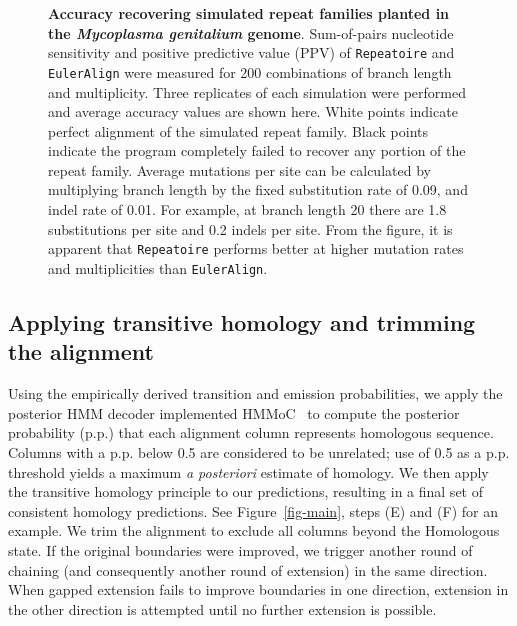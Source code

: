 \documentclass[12pt,journal,draftcls,letterpaper,onecolumn]{IEEEtran}
\begin{document}
\begin{figure*}[t!]
\centering {}
\caption[Accuracy recovering simulated repeat families planted in the
\textit{Mycoplasma genitalium} genome]%
{\textbf{Accuracy recovering simulated repeat families planted in the
\textit{Mycoplasma genitalium} genome}.  Sum-of-pairs nucleotide
sensitivity and positive predictive value (PPV) of \texttt{Repeatoire}
and \texttt{EulerAlign} were measured for 200
combinations of branch length and multiplicity.  Three replicates of
each simulation were performed and average accuracy values are shown
here.  White points indicate perfect alignment of the simulated repeat
family.  Black points indicate the program completely failed to
recover any portion of the repeat family.  Average mutations per site can be
calculated by multiplying branch length by the fixed substitution rate
of 0.09, and indel rate of 0.01.  For example, at branch length 20
there are 1.8 substitutions per site and 0.2 indels per site.  From
the figure, it is apparent that \texttt{Repeatoire} performs better
at higher mutation rates and multiplicities than \texttt{EulerAlign}.}
\label{fig-results}
\end{figure*}


\subsection{Applying transitive homology and trimming the alignment}
Using the empirically derived transition and emission probabilities,
we apply the posterior HMM decoder implemented HMMoC~\cite{Lunter2007} to compute the posterior probability (p.p.) that
each alignment column represents homologous sequence.  Columns with a
p.p. below 0.5 are considered to be unrelated; use of 0.5 as a p.p. threshold
yields a maximum \textit{a posteriori} estimate of homology.  We then apply the
transitive homology principle to our predictions, resulting in a final
set of consistent homology predictions. See Figure~\ref{fig-main},
steps (E) and (F) for an example. We trim the alignment to exclude all
columns beyond the Homologous state. If the original boundaries were
improved, we trigger another round of chaining (and consequently
another round of extension) in the same direction.
When gapped extension fails to improve boundaries
in one direction, extension in the other direction is attempted until
no further extension is possible.
\end{document}
